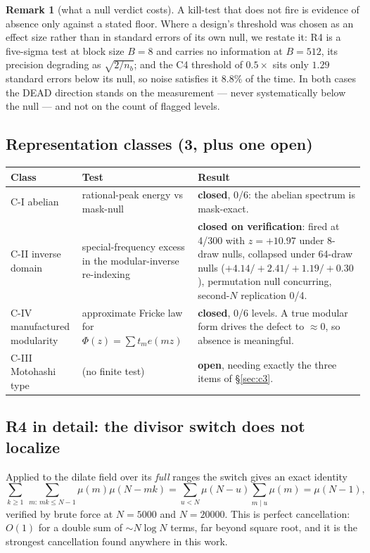 \documentclass[11pt,a4paper]{article}
\theoremstyle{plain}
\theoremstyle{definition}
\newtheorem{remark}[theorem]{Remark}
\begin{document}
\begin{remark}[what a null verdict costs]
A kill-test that does not fire is evidence of absence only against a
stated floor. Where a design's threshold was chosen as an effect size
rather than in standard errors of its own null, we restate it: R4 is a
five-sigma test at block size $B=8$ and carries no information at
$B=512$, its precision degrading as $\sqrt{2/n_b}$; and the C4
threshold of $0.5\times$ sits only $1.29$ standard errors below its
null, so noise satisfies it $8.8\%$ of the time. In both cases the
DEAD direction stands on the measurement --- never systematically below
the null --- and not on the count of flagged levels.
\end{remark}

\subsection{Representation classes (3, plus one open)}

\begin{longtable}{p{}p{}p{}}
\hline
Class & Test & Result\\
\hline
\endhead
C-I abelian & rational-peak energy vs mask-null &
 \textbf{closed}, 0/6: the abelian spectrum is mask-exact.\\
C-II inverse domain & special-frequency excess in the
 modular-inverse re-indexing &
 \textbf{closed on verification}: fired at 4/300 with $z = +10.97$
 under 8-draw nulls, collapsed under 64-draw nulls
 ($+4.14/+2.41/+1.19/+0.30$), permutation null concurring, second-$N$
 replication 0/4.\\
C-IV manufactured modularity & approximate Fricke law for
 $\Phi(z) = \sum t_m e(mz)$ &
 \textbf{closed}, 0/6 levels. A true modular form drives the defect to
 $\approx 0$, so absence is meaningful.\\
C-III Motohashi type & (no finite test) &
 \textbf{open}, needing exactly the three items of \S\ref{sec:c3}.\\
\hline
\end{longtable}

\subsection{R4 in detail: the divisor switch does not
localize}\label{sec:R4}

Applied to the dilate field over its \emph{full} ranges the switch
gives an exact identity
\[
  \sum_{k\ge1}\ \sum_{m:\,mk\le N-1}\mu(m)\mu(N-mk)
  = \sum_{u<N}\mu(N-u)\sum_{m\mid u}\mu(m)
  = \mu(N-1),
\]
verified by brute force at $N = 5000$ and $N = 20000$. This is perfect
cancellation: $O(1)$ for a double sum of $\sim N\log N$ terms, far
beyond square root, and it is the strongest cancellation found
anywhere in this work.
\end{document}
